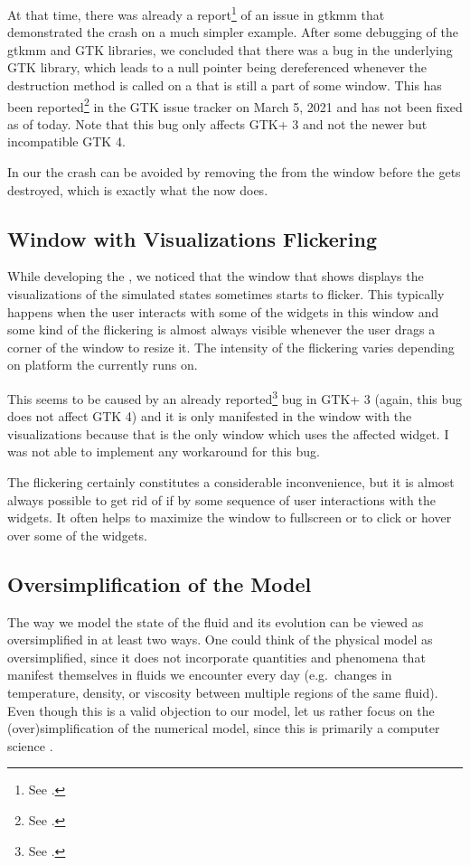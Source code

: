 \documentclass[11pt,a4paper,twoside,openright]{report}
\begin{document}
At that time, there was already a report\footnote{See \cite{GtkmmSwitchReport}.} of an issue in gtkmm that demonstrated the crash on a much simpler example. After some debugging of the gtkmm and GTK libraries, we concluded that there was a bug in the underlying GTK library, which leads to a null pointer being dereferenced whenever the destruction method is called on a  that is still a part of some window. This has been reported\footnote{See \cite{GtkSwitchReport}.} in the GTK issue tracker on March 5, 2021 and has not been fixed as of today. Note that this bug only affects GTK+ 3 and not the newer but incompatible GTK 4.

In our \software{} the crash can be avoided by removing the  from the window before the  gets destroyed, which is exactly what the \software{} now does.

\subsection{Window with Visualizations Flickering}
While developing the \software{}, we noticed that the window that shows displays the visualizations of the simulated states sometimes starts to flicker. This typically happens when the user interacts with some of the widgets in this window and some kind of the flickering is almost always visible whenever the user drags a corner of the window to resize it. The intensity of the flickering varies depending on platform the \software{} currently runs on.

This seems to be caused by an already reported\footnote{See \cite{GtkFlickerReport}.} bug in GTK+ 3 (again, this bug does not affect GTK 4) and it is only manifested in the window with the visualizations because that is the only window which uses the affected  widget. I was not able to implement any workaround for this bug.

The flickering certainly constitutes a considerable inconvenience, but it is almost always possible to get rid of if by some sequence of user interactions with the widgets. It often helps to maximize the window to fullscreen or to click or hover over some of the widgets.

\subsection{Oversimplification of the Model}
The way we model the state of the fluid and its evolution can be viewed as oversimplified in at least two ways. One could think of the physical model as oversimplified, since it does not incorporate quantities and phenomena that manifest themselves in fluids we encounter every day (e.g.\ changes in temperature, density, or viscosity between multiple regions of the same fluid). Even though this is a valid objection to our model, let us rather focus on the (over)simplification of the numerical model, since this \this{} is primarily a computer science \this{}.
\end{document}
